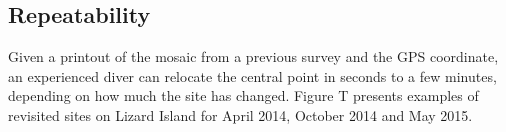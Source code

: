 \subsection{Repeatability}
Given a printout of the mosaic from a previous survey and the GPS coordinate, an experienced diver can relocate the central point in seconds to a few minutes, depending on how much the site has changed.
Figure T presents examples of revisited sites on Lizard Island for April 2014, October 2014 and May 2015.


    
  
  